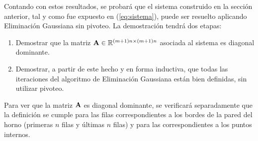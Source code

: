         Contando con estos resultados, se probará que el sistema construido en la sección anterior, tal y como fue expuesto en (\ref{eq:sistema}), puede ser resuelto aplicando Eliminación Gaussiana sin pivoteo. La demostración tendrá dos etapas:
        \begin{enumerate}
            \item Demostrar que la matriz $\mathbf{A} \in \mathbb{R}^{(m+1)n \times (m+1)n}$ asociada al sistema es diagonal dominante.
            \item Demostrar, a partir de este hecho y en forma inductiva, que todas las iteraciones del algoritmo de Eliminación Gaussiana están bien definidas, sin utilizar pivoteo.
        \end{enumerate}

        Para ver que la matriz $\mathbf{A}$ es diagonal dominante, se verificará separadamente que la definición se cumple para las filas correspondientes a los bordes de la pared del horno (primeras $n$ filas y últimas $n$ filas) y para las correspondientes a los puntos internos.

